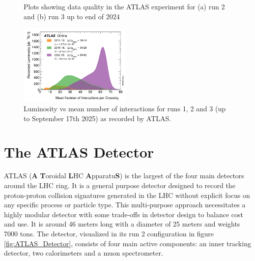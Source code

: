 \begin{figure}
\begin{subfigure}{.49\textwidth}
        \caption{}
        \label{fig:Data_Quality_Run3}
    \end{subfigure}
    \caption{Plots showing data quality in the ATLAS experiment for (a) run 2 and (b) run 3 up to end of 2024}
    \label{fig:Data_Quality}
\end{figure}

\begin{figure}
\centering
    \includegraphics[width=0.49\textwidth]{images/Luminosity_vs_Pileup.png}
    \caption{Luminosity vs mean number of interactions for runs 1, 2 and 3 (up to September 17th 2025) as recorded by ATLAS.}
    \label{fig:Luminosity_vs_Pileup}
\end{figure}

\section{The ATLAS Detector}

ATLAS (\textbf{A} \textbf{T}oroidal \textbf{L}HC \textbf{A}pparatu\textbf{S}) is the largest of the four main detectors 
around the LHC ring. It is a general purpose detector designed to record the proton-proton collision signatures 
generated in the LHC without explicit focus on any specific process or particle type. This multi-purpose approach 
necessitates a highly modular detector with some trade-offs in detector design to balance cost and use. It is around 46 
meters long with a diameter of 25 meters and weights 7000 tons. The detector, visualized in its run 2 configuration in 
figure \ref{fig:ATLAS_Detector}, consists of four main active components: an inner tracking detector, two calorimeters 
and a muon spectrometer. \par

